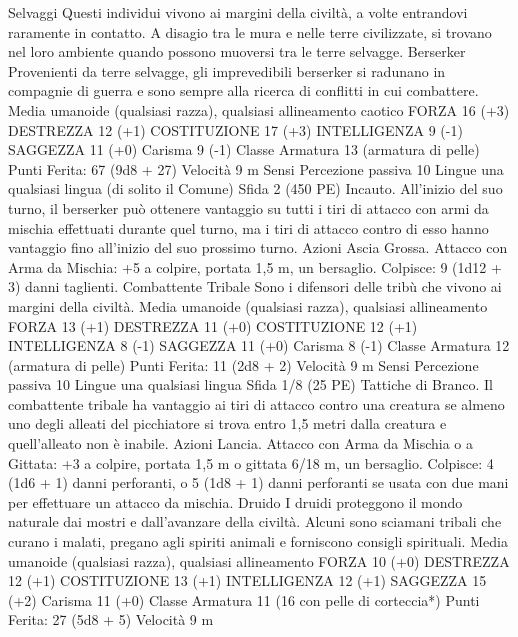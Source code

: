\begin{multicols}{2}
Selvaggi
Questi individui vivono ai margini della civiltà, a volte
entrandovi raramente in contatto. A disagio tra le mura
e nelle terre civilizzate, si trovano nel loro ambiente
quando possono muoversi tra le terre selvagge.
Berserker
Provenienti da terre selvagge, gli imprevedibili
berserker si radunano in compagnie di guerra e sono
sempre alla ricerca di conflitti in cui combattere.
Media umanoide (qualsiasi razza), qualsiasi allineamento
caotico
FORZA 16 (+3)
DESTREZZA 12 (+1)
COSTITUZIONE 17 (+3)
INTELLIGENZA 9 (-1)
SAGGEZZA 11 (+0)
Carisma 9 (-1)
Classe Armatura 13 (armatura di pelle)
\hspace*{0pt}\hfill{Punti Ferita}: 67 (9d8 + 27)
Velocità 9 m
Sensi Percezione passiva 10
Lingue una qualsiasi lingua (di solito il Comune)
Sfida 2 (450 PE)
Incauto. All’inizio del suo turno, il berserker può ottenere
vantaggio su tutti i tiri di attacco con armi da mischia effettuati
durante quel turno, ma i tiri di attacco contro di esso hanno
vantaggio fino all’inizio del suo prossimo turno.
Azioni
Ascia Grossa. Attacco con Arma da Mischia: +5 a colpire,
portata 1,5 m, un bersaglio.
Colpisce: 9 (1d12 + 3) danni taglienti.
Combattente Tribale
Sono i difensori delle tribù che vivono ai margini della
civiltà.
Media umanoide (qualsiasi razza), qualsiasi allineamento
FORZA 13 (+1)
DESTREZZA 11 (+0)
COSTITUZIONE 12 (+1)
INTELLIGENZA 8 (-1)
SAGGEZZA 11 (+0)
Carisma 8 (-1)
Classe Armatura 12 (armatura di pelle)
\hspace*{0pt}\hfill{Punti Ferita}: 11 (2d8 + 2)
Velocità 9 m
Sensi Percezione passiva 10
Lingue una qualsiasi lingua
Sfida 1/8 (25 PE)
Tattiche di Branco. Il combattente tribale ha vantaggio ai tiri di
attacco contro una creatura se almeno uno degli alleati del
picchiatore si trova entro 1,5 metri dalla creatura e quell’alleato
non è inabile.
Azioni
Lancia. Attacco con Arma da Mischia o a Gittata: +3 a colpire,
portata 1,5 m o gittata 6/18 m, un bersaglio.
Colpisce: 4 (1d6 + 1) danni perforanti, o 5 (1d8 + 1) danni
perforanti se usata con due mani per effettuare un attacco da
mischia.
Druido
I druidi proteggono il mondo naturale dai mostri e
dall’avanzare della civiltà. Alcuni sono sciamani tribali
che curano i malati, pregano agli spiriti animali e
forniscono consigli spirituali.
Media umanoide (qualsiasi razza), qualsiasi allineamento
FORZA 10 (+0)
DESTREZZA 12 (+1)
COSTITUZIONE 13 (+1)
INTELLIGENZA 12 (+1)
SAGGEZZA 15 (+2)
Carisma 11 (+0)
Classe Armatura 11 (16 con pelle di corteccia*)
\hspace*{0pt}\hfill{Punti Ferita}: 27 (5d8 + 5)
Velocità 9 m

\end{multicols}
